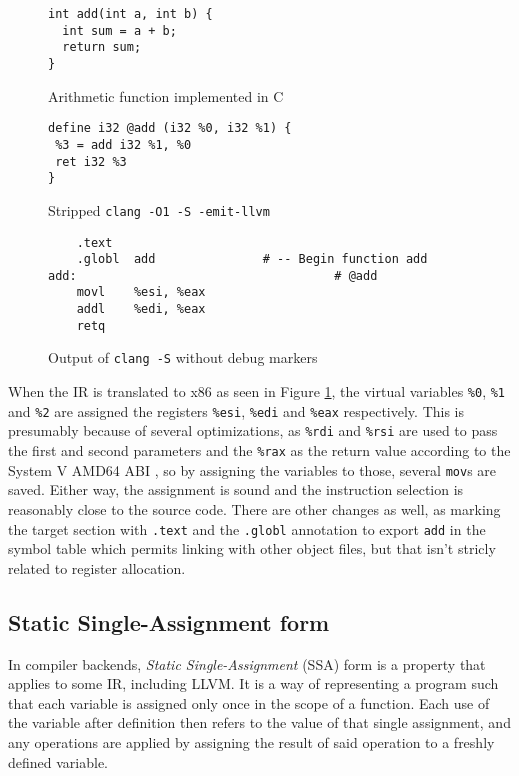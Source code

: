 \documentclass{article}
\begin{document}
\begin{figure}[H]
   \begin{minipage}{0.48\textwidth}
     \centering
     \begin{verbatim}
int add(int a, int b) {
  int sum = a + b;
  return sum;
}
     \end{verbatim}
     \caption{Arithmetic function implemented in C}\label{fig:addc}
   \end{minipage}\hfill
   \begin{minipage}{0.48\textwidth}
     \centering
     \begin{verbatim}
define i32 @add (i32 %0, i32 %1) {
 %3 = add i32 %1, %0
 ret i32 %3
}
     \end{verbatim}
     \caption{Stripped \texttt{clang -O1 -S -emit-llvm}}\label{fig:addll}
   \end{minipage}
   \begin{center}
   \begin{minipage}{0.83\textwidth}
     \centering
     \begin{verbatim}
	.text
	.globl	add               # -- Begin function add
add:                                    # @add
	movl	%esi, %eax
	addl	%edi, %eax
	retq
     \end{verbatim}
     \caption{Output of \texttt{clang -S} without debug markers}\label{fig:addx86}
   \end{minipage}
   \end{center}
\end{figure}
\noindent When the IR is translated to x86 as seen in Figure \ref{fig:addx86}, the virtual variables \texttt{\%0}, \texttt{\%1} and \texttt{\%2} are assigned the registers \texttt{\%esi}, \texttt{\%edi} and \texttt{\%eax} respectively. This is presumably because of several optimizations, as \texttt{\%rdi} and \texttt{\%rsi} are used to pass the first and second parameters and the \texttt{\%rax} as the return value according to the System V AMD64 ABI \cite{sysv}, so by assigning the variables to those, several \texttt{mov}s are saved. Either way, the assignment is sound and the instruction selection is reasonably close to the  source code. There are other changes as well, as marking the target section with \texttt{.text} and the \texttt{.globl} annotation to export \texttt{add} in the symbol table which permits linking with other object files, but that isn't stricly related to register allocation.


\subsection{Static Single-Assignment form}
In compiler backends, \textit{Static Single-Assignment} (SSA) form is a property that applies to some IR, including LLVM.
It is a way of representing a program such that each variable is assigned only once in
the scope of a function. Each use of the variable after definition then refers to the value  of that  single assignment, and any operations are applied by assigning the result of said operation to a freshly defined variable.
\end{document}
